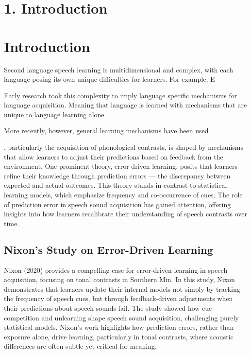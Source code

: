 \section{1. Introduction}

\section{Introduction}


Second language speech learning is multidimensional and complex, with each language posing its own unique difficulties for learners. For example, E



Early research took this complexity to imply language specific mechanisms for language acquisition. Meaning that language is learned with mechanisms that are unique to language learning alone. 


More recently, however, general learning mechanisms have been used   


, particularly the acquisition of phonological contrasts, is shaped by mechanisms that allow learners to adjust their predictions based on feedback from the environment. One prominent theory, error-driven learning, posits that learners refine their knowledge through prediction errors — the discrepancy between expected and actual outcomes. This theory stands in contrast to statistical learning models, which emphasize frequency and co-occurrence of cues. The role of prediction error in speech sound acquisition has gained attention, offering insights into how learners recalibrate their understanding of speech contrasts over time.

\subsection{Nixon’s Study on Error-Driven Learning}

Nixon (2020) provides a compelling case for error-driven learning in speech acquisition, focusing on tonal contrasts in Southern Min. In this study, Nixon demonstrates that learners update their internal models not simply by tracking the frequency of speech cues, but through feedback-driven adjustments when their predictions about speech sounds fail. The study showed how cue competition and unlearning shape speech sound acquisition, challenging purely statistical models. Nixon's work highlights how prediction errors, rather than exposure alone, drive learning, particularly in tonal contrasts, where acoustic differences are often subtle yet critical for meaning.

